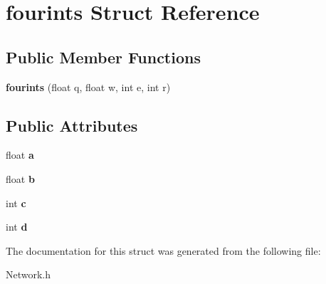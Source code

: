 \hypertarget{structfourints}{\section{fourints Struct Reference}
\label{structfourints}
}
\subsection*{Public Member Functions}
\begin{DoxyCompactItemize}
\item 
\hypertarget{structfourints_a6b193a473f9f98c12d4dce0cece0ea4f}{{\bfseries fourints} (float q, float w, int e, int r)}\label{structfourints_a6b193a473f9f98c12d4dce0cece0ea4f}

\end{DoxyCompactItemize}
\subsection*{Public Attributes}
\begin{DoxyCompactItemize}
\item 
\hypertarget{structfourints_a307cbed21b295f92d0f736fc628b2457}{float {\bfseries a}}\label{structfourints_a307cbed21b295f92d0f736fc628b2457}

\item 
\hypertarget{structfourints_a33f6af2a2d23f3e6d3c4af1fd77b91ea}{float {\bfseries b}}\label{structfourints_a33f6af2a2d23f3e6d3c4af1fd77b91ea}

\item 
\hypertarget{structfourints_a1d6ee8c6209be28d4e54a73d169fb4fb}{int {\bfseries c}}\label{structfourints_a1d6ee8c6209be28d4e54a73d169fb4fb}

\item 
\hypertarget{structfourints_acc0c230eb3664469745516b5a8673f97}{int {\bfseries d}}\label{structfourints_acc0c230eb3664469745516b5a8673f97}

\end{DoxyCompactItemize}


The documentation for this struct was generated from the following file\-:\begin{DoxyCompactItemize}
\item 
Network.\-h\end{DoxyCompactItemize}
